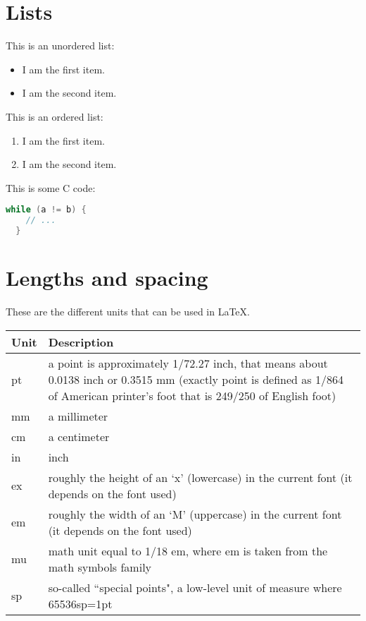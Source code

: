 \documentclass{article}
\begin{document}
\section{Lists}

This is an unordered list:

\begin{itemize}
  \item I am the first item.
  \item I am the second item.
\end{itemize}

This is an ordered list:

\begin{enumerate}
  \item I am the first item.
  \item I am the second item.
\end{enumerate}

This is some C code:

\begin{lstlisting}[language=C]
  while (a != b) {
    // ...
  }
\end{lstlisting}

\section{Lengths and spacing}

These are the different units that can be used in \LaTeX.

\vspace{1em}
\begin{tabular}{| p{} | p{} |}
  \hline
  Unit & Description \\
  \hline
  pt & a point is approximately 1/72.27 inch, that means about 0.0138 inch or
       0.3515 mm (exactly point is defined as 1/864 of American printer's foot
       that is 249/250 of English foot) \\
  mm & a millimeter \\
  cm & a centimeter \\
  in & inch \\
  ex & roughly the height of an `x' (lowercase) in the current font (it depends
       on the font used) \\
  em & roughly the width of an `M' (uppercase) in the current font (it depends
       on the font used) \\
  mu & math unit equal to 1/18 em, where em is taken from the math symbols
       family \\
  sp & so-called ``special points", a low-level unit of measure where
       65536sp=1pt \\
  \hline
\end{tabular}
\vspace{1em}
\end{document}
